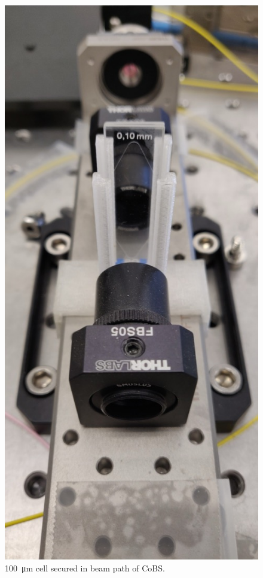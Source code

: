 \begin{figure}[t]
  \centering
  \includegraphics[height=.8\textheight]{figs/4-Raman/100umCS2.jpg}
  \caption{\SI{100}{\micro\meter}  cell secured in beam path of \acl{CoBS}.}
  \label{fig:Raman:100umCS2}
\end{figure}

